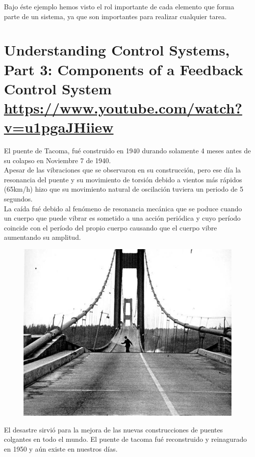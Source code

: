 \documentclass[
	12pt, %
]{fphw}
\begin{document}
Bajo éste ejemplo hemos visto el rol importante de cada elemento que forma parte de un sistema, ya que son importantes para realizar cualquier tarea.

\newpage
\section*{{\color{RoyalPurple}Understanding Control Systems, Part 3: Components of a Feedback Control System} \url{https://www.youtube.com/watch?v=u1pgaJHiiew}}

El puente de Tacoma, fué construido en 1940 durando solamente 4 meses antes de su colapso en Noviembre 7 de 1940.\\

Apesar de las vibraciones que se observaron en su construcción, pero ese día la resonancia del puente y su movimiento de torsión debido a vientos más rápidos (65km/h) hizo que su movimiento natural de oscilación tuviera un periodo de 5 segundos.\\

La caída fué debido al fenómeno de resonancia mecánica que se poduce cuando un cuerpo que puede vibrar es sometido a una acción periódica y cuyo período coincide con el período del propio cuerpo causando que el cuerpo vibre aumentando su amplitud. 

\begin{figure}[H]
  \centering
  \includegraphics[scale=0.4]{images/tacoma.jpg}
\end{figure}

El desastre sirvió para la mejora de las nuevas construcciones de puentes colgantes en todo el mundo. El puente de tacoma fué reconstruido y reinagurado en 1950 y aún existe en nuestros días.
\end{document}
